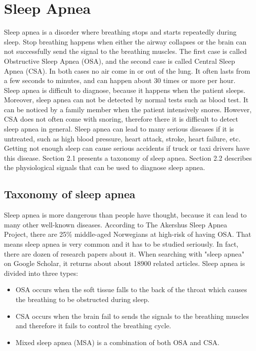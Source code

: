 
\chapter{Sleep Apnea} %

\label{Chapter2} %

Sleep apnea is a disorder where breathing stops and starts repeatedly during sleep. Stop breathing happens when either the airway collapses or the brain can not successfully send the signal to the breathing muscles. The first case is called Obstructive Sleep Apnea (OSA), and the second case is called Central Sleep Apnea (CSA). In both cases no air come in or out of the lung. It often lasts from a few seconds to minutes, and can happen about 30 times or more per hour\citep{NHLBI}. Sleep apnea is difficult to diagnose, because it happens when the patient sleeps. Moreover, sleep apnea can not be detected by normal tests such as blood test. It can be noticed by a family member when the patient intensively snores. However, CSA does not often come with snoring, therefore there it is difficult to detect sleep apnea in general. Sleep apnea can lead to many serious diseases if it is untreated, such as high blood pressure, heart attack, stroke, heart failure, etc. Getting not enough sleep can cause serious accidents if truck or taxi drivers have this disease. Section 2.1 presents a taxonomy of sleep apnea. Section 2.2 describes the physiological signals that can be used to diagnose sleep apnea.

\section{Taxonomy of sleep apnea}
Sleep apnea is more dangerous than people have thought, because it can lead to many other well-known diseases. According to The Akershus Sleep Apnea Project, there are 25\% middle-aged Norwegians at high-risk of having OSA\citep{Akershus}. That means sleep apnea is very common and it has to be studied seriously. In fact, there are dozen of research papers about it. When searching with "sleep apnea" on Google Scholar, it returns about about 18900 related articles. Sleep apnea is divided into three types:

\begin{itemize}
  \item OSA occurs when the soft tissue falls to the back of the throat which causes the breathing to be obstructed during sleep.
  \item CSA occurs when the brain fail to sends the signals to the breathing muscles and therefore it fails to control the breathing cycle.
  \item Mixed sleep apnea (MSA) is a combination of both OSA and CSA.
\end{itemize}
